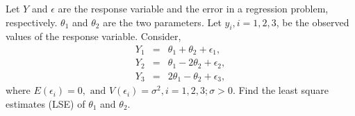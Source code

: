 \documentclass[addpoints,answers,a4paper,11pt]{exam}
\begin{document}
\begin{questions}

   \question[5] Let $Y$ and $\epsilon$ are the response variable and the error
   in a regression problem, respectively. $\theta_1$ and $\theta_2$ are the two
   parameters. Let $y_i, i=1,2,3$, be the observed values of the response
   variable. Consider,
   \begin{eqnarray}
      Y_1 &=& \theta_1 + \theta_2 + \epsilon_1, \nonumber \\
      Y_2 &=& \theta_1 - 2\theta_2 + \epsilon_2, \nonumber \\
      Y_3 &=& 2\theta_1 - \theta_2 + \epsilon_3, \nonumber 
   \end{eqnarray}
   where $E(\epsilon_i) = 0, \mbox{ and } V(\epsilon_i)= \sigma^2, i=1,2,3;
   \sigma > 0$. Find the least square estimates (LSE) of $\theta_1$ and
   $\theta_2$. 


\end{questions}
\end{document}
